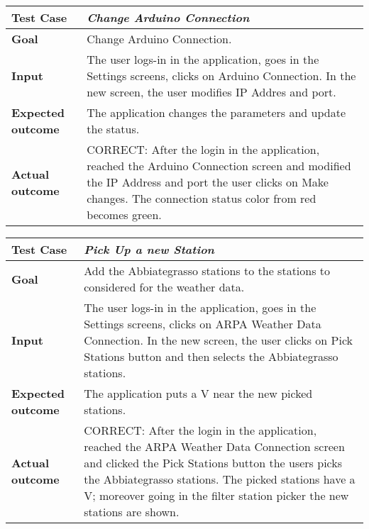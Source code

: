 \begin{table}[H]
\begin{tabular}{| p{} | p{} |}
  \hline
  \textbf{Test Case} & \textit{Change Arduino Connection} \\ \hline
  \textbf{Goal} & Change Arduino Connection. \\ \hline
  \textbf{Input} & The user logs-in in the application, goes in the Settings screens, clicks on Arduino Connection. In the new screen, the user modifies IP Addres and port. \\ \hline
  \textbf{Expected outcome} & The application changes the parameters and update the status.\\ \hline
  \textbf{Actual outcome} & CORRECT: After the login in the application, reached the Arduino Connection screen and modified the IP Address and port the user clicks on Make changes. The connection status color from red becomes green.\\ \hline
\end{tabular}
\end{table}

\begin{table}[H]
\begin{tabular}{| p{} | p{} |}
  \hline
  \textbf{Test Case} & \textit{Pick Up a new Station} \\ \hline
  \textbf{Goal} & Add the Abbiategrasso stations to the stations to considered for the weather data. \\ \hline
  \textbf{Input} & The user logs-in in the application, goes in the Settings screens, clicks on ARPA Weather Data Connection. In the new screen, the user clicks on Pick Stations button and then selects the Abbiategrasso stations. \\ \hline
  \textbf{Expected outcome} & The application puts a V near the new picked stations.\\ \hline
  \textbf{Actual outcome} & CORRECT: After the login in the application, reached the ARPA Weather Data Connection screen and clicked the Pick Stations button the users picks the Abbiategrasso stations. The picked stations have a V; moreover going in the filter station picker the new stations are shown.\\ \hline
\end{tabular}
\end{table}